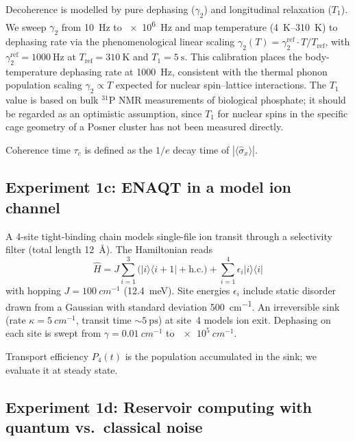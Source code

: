 \documentclass[twocolumn,11pt]{article}
\newcommand{\Pfour}{P_{4}}
\begin{document}
Decoherence is modelled by pure dephasing ($\gamma_2$) and
longitudinal relaxation ($T_1$).
We sweep $\gamma_2$ from \SI{10}{\hertz} to \SI{e6}{\hertz}
and map temperature (\SIrange{4}{310}{\kelvin}) to dephasing
rate via the phenomenological linear scaling
$\gamma_2(T) = \gamma_2^{\mathrm{ref}} \cdot T / T_{\mathrm{ref}}$,
with $\gamma_2^{\mathrm{ref}} = \SI{1000}{\hertz}$ at
$T_{\mathrm{ref}} = \SI{310}{\kelvin}$ and
$T_1 = \SI{5}{\second}$.
This calibration places the body-temperature dephasing rate
at \SI{1000}{\hertz}, consistent with the thermal
phonon population scaling $\gamma_2 \propto T$ expected
for nuclear spin--lattice interactions.
The $T_1$ value is based on bulk $^{31}$P NMR measurements
of biological phosphate; it should be regarded as an optimistic
assumption, since $T_1$ for nuclear spins in the specific cage
geometry of a Posner cluster has not been measured directly.

Coherence time $\tau_c$ is defined as the $1/e$ decay time
of $|\langle \hat{\sigma}_x \rangle|$.

\subsection{Experiment 1c: ENAQT in a model ion channel}
\label{sec:meth-1c}

A 4-site tight-binding chain models single-file ion transit
through a selectivity filter (total length \SI{12}{\angstrom}).
The Hamiltonian reads
\begin{equation}
  \hat{H} = J \sum_{i=1}^{3} \bigl(|i\rangle\langle i{+}1| +
    \mathrm{h.c.}\bigr)
    + \sum_{i=1}^{4} \epsilon_i |i\rangle\langle i|
  \label{eq:H-channel}
\end{equation}
with hopping $J = \SI{100}{cm^{-1}}$ (\SI{12.4}{\meV}).
Site energies $\epsilon_i$ include static disorder drawn from a
Gaussian with standard deviation \SI{500}{cm^{-1}}.
An irreversible sink (rate $\kappa = \SI{5}{cm^{-1}}$,
transit time ${\sim}\SI{5}{\pico\second}$) at site~4 models
ion exit.  Dephasing on each site is swept from
$\gamma = \SI{0.01}{cm^{-1}}$ to $\SI{e5}{cm^{-1}}$.

Transport efficiency $\Pfour(t)$ is the population accumulated
in the sink; we evaluate it at steady state.

\subsection{Experiment 1d: Reservoir computing with quantum vs.\
  classical noise}
\label{sec:meth-1d}
\end{document}
